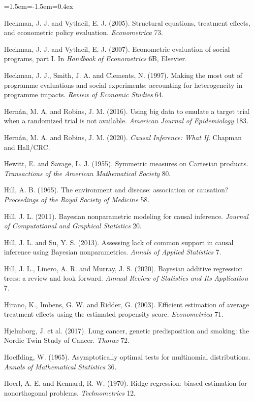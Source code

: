 \begin{list}{}{\leftmargin=1.5em\itemindent=-1.5em\itemsep=0.4ex}
\item Heckman, J. J. and Vytlacil, E. J. (2005). Structural equations, treatment effects, and econometric policy evaluation. \emph{Econometrica} 73.
\item Heckman, J. J. and Vytlacil, E. J. (2007). Econometric evaluation of social programs, part I. In \emph{Handbook of Econometrics} 6B, Elsevier.
\item Heckman, J. J., Smith, J. A. and Clements, N. (1997). Making the most out of programme evaluations and social experiments: accounting for heterogeneity in programme impacts. \emph{Review of Economic Studies} 64.
\item Hern\'an, M. A. and Robins, J. M. (2016). Using big data to emulate a target trial when a randomized trial is not available. \emph{American Journal of Epidemiology} 183.
\item Hern\'an, M. A. and Robins, J. M. (2020). \emph{Causal Inference: What If}. Chapman and Hall/CRC.
\item Hewitt, E. and Savage, L. J. (1955). Symmetric measures on Cartesian products. \emph{Transactions of the American Mathematical Society} 80.
\item Hill, A. B. (1965). The environment and disease: association or causation? \emph{Proceedings of the Royal Society of Medicine} 58.
\item Hill, J. L. (2011). Bayesian nonparametric modeling for causal inference. \emph{Journal of Computational and Graphical Statistics} 20.
\item Hill, J. L. and Su, Y. S. (2013). Assessing lack of common support in causal inference using Bayesian nonparametrics. \emph{Annals of Applied Statistics} 7.
\item Hill, J. L., Linero, A. R. and Murray, J. S. (2020). Bayesian additive regression trees: a review and look forward. \emph{Annual Review of Statistics and Its Application} 7.
\item Hirano, K., Imbens, G. W. and Ridder, G. (2003). Efficient estimation of average treatment effects using the estimated propensity score. \emph{Econometrica} 71.
\item Hjelmborg, J. et al. (2017). Lung cancer, genetic predisposition and smoking: the Nordic Twin Study of Cancer. \emph{Thorax} 72.
\item Hoeffding, W. (1965). Asymptotically optimal tests for multinomial distributions. \emph{Annals of Mathematical Statistics} 36.
\item Hoerl, A. E. and Kennard, R. W. (1970). Ridge regression: biased estimation for nonorthogonal problems. \emph{Technometrics} 12.

\end{list}
